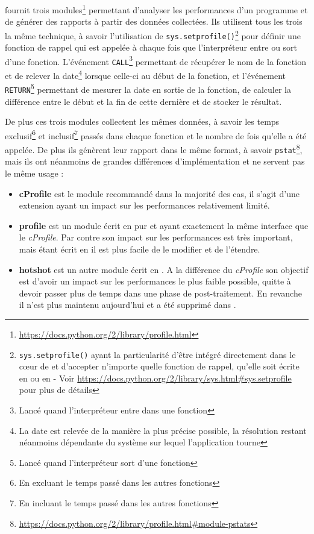 \Python fournit trois modules\footnote{\url{https://docs.python.org/2/library/profile.html}} permettant d'analyser les performances d'un programme et de générer des rapports à partir des données collectées. Ils utilisent tous les trois la même technique, à savoir l'utilisation de \verb|sys.setprofile()|\footnote{\verb?sys.setprofile()? ayant la particularité d'être intégré directement dans le cœur de \Python et d'accepter n'importe quelle fonction de rappel, qu'elle soit écrite en \C ou en \Python - Voir \url{https://docs.python.org/2/library/sys.html#sys.setprofile} pour plus de détails} pour définir une fonction de rappel qui est appelée à chaque fois que l'interpréteur entre ou sort d'une fonction. L'événement \verb|CALL|\footnote{Lancé quand l'interpréteur entre dans une fonction} permettant de récupérer le nom de la fonction et de relever la date\footnote{La date est relevée de la manière la plus précise possible, la résolution restant néanmoins dépendante du système sur lequel l'application tourne} lorsque celle-ci au début de la fonction, et l'événement \verb|RETURN|\footnote{Lancé quand l'interpréteur sort d'une fonction} permettant de mesurer la date en sortie de la fonction, de calculer la différence entre le début et la fin de cette dernière et de stocker le résultat.

De plus ces trois modules collectent les mêmes données, à savoir les temps exclusif\footnote{En excluant le temps passé dans les autres fonctions} et inclusif\footnote{En incluant le temps passé dans les autres fonctions} passés dans chaque fonction et le nombre de fois qu'elle a été appelée. De plus ils génèrent leur rapport dans le même format, à savoir \verb|pstat|\footnote{\url{https://docs.python.org/2/library/profile.html#module-pstats}}, mais ils ont néanmoins de grandes différences d'implémentation et ne servent pas le même usage : 

\begin{itemize}
\item \textbf{cProfile} est le module recommandé dans la majorité des cas, il s'agit d'une extension \C ayant un impact sur les performances relativement limité.
\item \textbf{profile} est un module écrit en pur \Python et ayant exactement la même interface que le \emph{cProfile}. Par contre son impact sur les performances est très important, mais étant écrit en \Python il est plus facile de le modifier et de l'étendre.
\item \textbf{hotshot} est un autre module écrit en \C. A la différence du \emph{cProfile} son objectif est d'avoir un impact sur les performances le plus faible possible, quitte à devoir passer plus de temps dans une phase de post-traitement. En revanche il n'est plus maintenu aujourd'hui et a été supprimé dans .
\end{itemize}